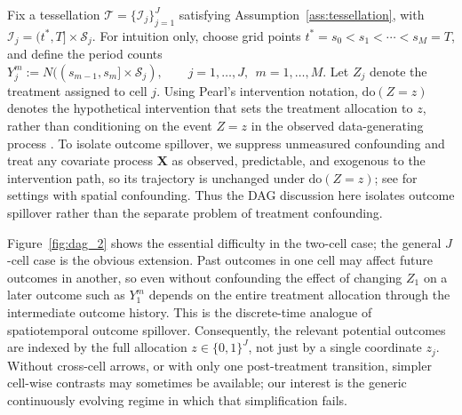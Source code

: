 \documentclass{statsoc}
\newcommand{\1}{\mathbbm{1}}
\newcommand{\CovX}{\mathbf{X}}
\newcommand{\Nproc}{N}
\begin{document}
Fix a tessellation \(\mathcal T=\{\mathcal I_j\}_{j=1}^J\) satisfying Assumption~\ref{ass:tessellation}, with
\(\mathcal I_j=(t^\ast,T]\times \mathcal S_j\). For intuition only, choose grid points \(t^\ast=s_0<s_1<\cdots<s_M=T\), and define the period counts
\(
Y_j^m:=\Nproc((s_{m-1},s_m]\times \mathcal S_j),
\qquad j=1,\ldots,J,\ \ m=1,\ldots,M.
\)
Let \(Z_j\) denote the treatment assigned to cell \(j\). Using Pearl's intervention notation, $\mathrm{do}(Z=z)$ denotes the hypothetical intervention that sets the treatment allocation to $z$, rather than conditioning on the event $Z=z$ in the observed data-generating process \citep{pearl2009causal}. To isolate outcome spillover, we suppress unmeasured confounding and treat any covariate process \(\CovX\) as observed, predictable, and exogenous to the intervention path, so its trajectory is unchanged under \(\mathrm{do}(Z=z)\); see \citet{papadogeorgou2023spatial} for settings with spatial confounding. 
Thus the DAG discussion here isolates outcome spillover rather than the separate problem of treatment confounding.

Figure~\ref{fig:dag_2} shows the essential difficulty in the two-cell case; the general \(J\)-cell case is the obvious extension. Past outcomes in one cell may affect future outcomes in another, so even without confounding the effect of changing \(Z_1\) on a later outcome such as \(Y_1^m\) depends on the entire treatment allocation through the intermediate outcome history. This is the discrete-time analogue of spatiotemporal outcome spillover. Consequently, the relevant potential outcomes are indexed by the full allocation \(z\in\{0,1\}^J\), not just by a single coordinate \(z_j\). Without cross-cell arrows, or with only one post-treatment transition, simpler cell-wise contrasts may sometimes be available; our interest is the generic continuously evolving regime in which that simplification fails.
\end{document}
